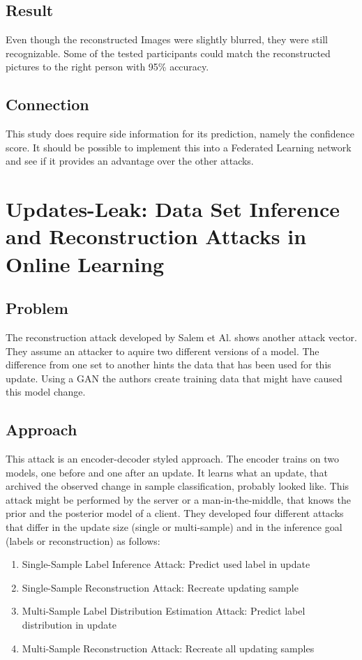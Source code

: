 \documentclass[
	ngerman,
	ruledheaders=section,%
	class=report,%
	thesis={type=bachelor},%
	accentcolor=1b,%
	custommargins=true,%
	marginpar=false,%
	parskip=half-,%
	fontsize=11pt,%
]{tudapub}
\begin{document}
 \subsection{Result}
 Even though the reconstructed Images were slightly blurred, they were still recognizable. Some of the tested participants could match the reconstructed pictures to the right person with 95\% accuracy.

\subsection{Connection}
This study does require side information for its prediction, namely the confidence score. It should be possible to implement this into a Federated Learning network and see if it provides an advantage over the other attacks.







\section{Updates-Leak: Data Set Inference and Reconstruction Attacks in Online Learning}
\subsection{Problem}
The reconstruction attack developed by Salem et Al. \cite{salem2019updates} shows another attack vector. They assume an attacker to aquire two different versions of a model. The difference from one set to another hints the data that has been used for this update. Using a GAN the authors create training data that might have caused this model change. 

\subsection{Approach}
This attack is an encoder-decoder styled approach. The encoder trains on two models, one before and one after an update. It learns what an update, that archived the observed change in sample classification, probably looked like. This attack might be performed by the server or a man-in-the-middle, that knows the prior and the posterior model of a client. They developed four different attacks that differ in the update size (single or multi-sample) and in the inference goal (labels or reconstruction) as follows:
\begin{enumerate}
    \item Single-Sample Label Inference Attack: Predict used label in update
    \item Single-Sample Reconstruction Attack: Recreate updating sample
    \item Multi-Sample Label Distribution Estimation Attack: Predict label distribution in update
    \item Multi-Sample Reconstruction Attack: Recreate all updating samples
\end{enumerate}
\end{document}
